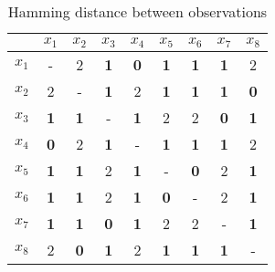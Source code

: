 \documentclass[12pt]{article}
\begin{document}
\begin{enumerate}[leftmargin=\labelsep]
    \begin{table}[H]
        \begin{center}
            \begin{tabular}{c|cccccccc}
            & $x_1$ & $x_2$ & $x_3$ & $x_4$ & $x_5$ & $x_6$ & $x_7$ & $x_8$\\ 
            \hline
                $x_1$ & \-- & 2 & \textbf{\textcolor{codeblue}{1}} & \textbf{\textcolor{codeblue}{0}} & \textbf{\textcolor{codeblue}{1}} & \textbf{\textcolor{codeblue}{1}} & \textbf{\textcolor{codeblue}{1}} & 2 \\ 
                $x_2$ & 2 & \-- & \textbf{\textcolor{codeblue}{1}} & 2 & \textbf{\textcolor{codeblue}{1}} & \textbf{\textcolor{codeblue}{1}} & \textbf{\textcolor{codeblue}{1}} & \textbf{\textcolor{codeblue}{0}} \\ 
                $x_3$ & \textbf{\textcolor{codeblue}{1}} & \textbf{\textcolor{codeblue}{1}} & \-- & \textbf{\textcolor{codeblue}{1}} & 2 & 2 & \textbf{\textcolor{codeblue}{0}} & \textbf{\textcolor{codeblue}{1}} \\ 
                $x_4$ & \textbf{\textcolor{codeblue}{0}} & 2 & \textbf{\textcolor{codeblue}{1}} & \-- & \textbf{\textcolor{codeblue}{1}} & \textbf{\textcolor{codeblue}{1}} & \textbf{\textcolor{codeblue}{1}} & 2 \\ 
                $x_5$ & \textbf{\textcolor{codeblue}{1}} & \textbf{\textcolor{codeblue}{1}} & 2 & \textbf{\textcolor{codeblue}{1}} & \-- & \textbf{\textcolor{codeblue}{0}} & 2 & \textbf{\textcolor{codeblue}{1}} \\ 
                $x_6$ & \textbf{\textcolor{codeblue}{1}} & \textbf{\textcolor{codeblue}{1}} & 2 & \textbf{\textcolor{codeblue}{1}} & \textbf{\textcolor{codeblue}{0}} & \-- & 2 & \textbf{\textcolor{codeblue}{1}} \\ 
                $x_7$ & \textbf{\textcolor{codeblue}{1}} & \textbf{\textcolor{codeblue}{1}} & \textbf{\textcolor{codeblue}{0}} & \textbf{\textcolor{codeblue}{1}} & 2 & 2 & \-- & \textbf{\textcolor{codeblue}{1}} \\ 
                $x_8$ & 2 & \textbf{\textcolor{codeblue}{0}} & \textbf{\textcolor{codeblue}{1}} & 2 & \textbf{\textcolor{codeblue}{1}} & \textbf{\textcolor{codeblue}{1}} & \textbf{\textcolor{codeblue}{1}} & \-- \\ 
            \end{tabular}
            \caption{Hamming distance between observations}
        \end{center}
    \end{table}


\end{enumerate}
\end{document}
